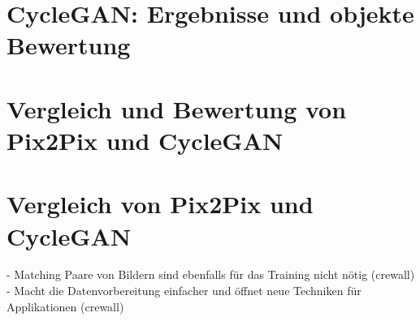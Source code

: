 \section{CycleGAN: Ergebnisse und objekte Bewertung}
\section{Vergleich und Bewertung von Pix2Pix und CycleGAN}


\section{Vergleich von Pix2Pix und CycleGAN}
- Matching Paare von Bildern sind ebenfalls für das Training nicht nötig (crewall)
- Macht die Datenvorbereitung einfacher und öffnet neue Techniken für Applikationen (crewall)